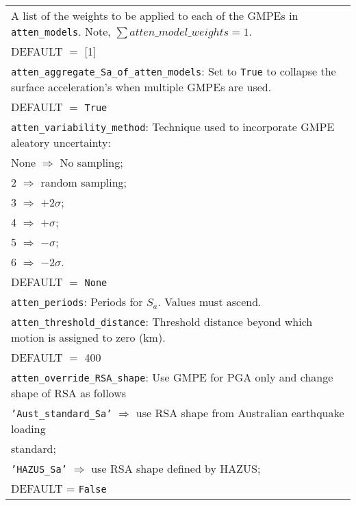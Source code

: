 \documentclass[a4paper, 12pt]{report}
\begin{document}
\begin{tabular}{|p{\textwidth}|}
A list of the weights to be applied to each of the GMPEs in
\texttt{atten\_models}.  Note, $\sum  atten\_model\_weights=1$. \\
\hspace{5em} DEFAULT $=$ [1] \\
\hline
\vspace{0.1em} \texttt{atten\_aggregate\_Sa\_of\_atten\_models}:
Set to
\texttt{True} to collapse the surface acceleration's when
multiple GMPEs are used.\\
\hspace{5em} DEFAULT $=$ \texttt{True} \\
\hline
\vspace{0.1em} \texttt{atten\_variability\_method}:
 Technique used to
incorporate GMPE aleatory uncertainty: \\
 \hspace{0.5em} None $\Rightarrow$ No sampling; \\
 \hspace{0.5em} 2 $\Rightarrow$ random sampling; \\
 \hspace{0.5em} 3 $\Rightarrow$ $+2\sigma$; \\
 \hspace{0.5em} 4 $\Rightarrow$ $+\sigma$; \\
 \hspace{0.5em} 5 $\Rightarrow$ $-\sigma$; \\
 \hspace{0.5em} 6 $\Rightarrow$ $-2\sigma$.\\
\hspace{5em} DEFAULT $=$ \texttt{None} \\
\hline
\vspace{0.1em} \texttt{atten\_periods}:
Periods for $S_a$. Values must ascend. \\
\hline
\vspace{0.1em} \texttt{atten\_threshold\_distance}:
Threshold distance beyond which motion is assigned to zero (km). \\
\hspace{5em} DEFAULT $=$ 400 \\
\hline
\vspace{0.1em} \texttt{atten\_override\_RSA\_shape}:
Use GMPE for PGA only and change shape of RSA as follows\\
 \hspace{0.5em} \texttt{'Aust\_standard\_Sa'} $\Rightarrow$
use RSA shape from Australian earthquake loading \\
\hspace{11em} standard; \\
 \hspace{0.5em} \texttt{'HAZUS\_Sa'}  $\Rightarrow$ use RSA shape defined by HAZUS;\\
 \hspace{5em} DEFAULT = \texttt{False} \\
\hline
\end{tabular}
\end{document}
